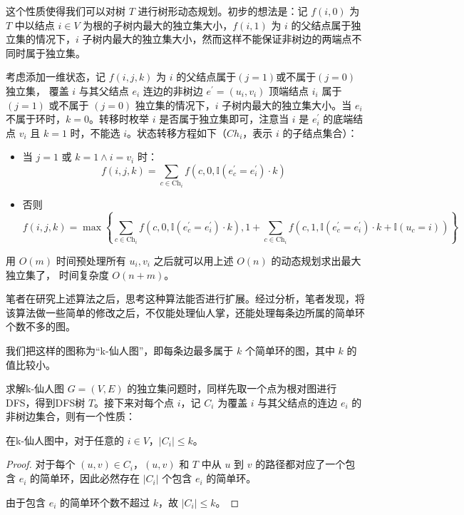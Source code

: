 \documentclass[lang=cn,11pt,a4paper]{elegantpaper}
\newcommand{\I}{\mathbb{I}}
\begin{document}
这个性质使得我们可以对树 $T$ 进行树形动态规划。初步的想法是：记 $f(i, 0)$ 为 $T$ 中以结点 $i \in V$ 为根的子树内最大的独立集大小，$f(i, 1)$ 为 $i$ 的父结点属于独立集的情况下，$i$ 子树内最大的独立集大小，然而这样不能保证非树边的两端点不同时属于独立集。

考虑添加一维状态，记 $f(i, j, k)$ 为 $i$ 的父结点属于$(j = 1)$或不属于$(j = 0)$独立集， 覆盖 $i$ 与其父结点 $e_i$ 连边的非树边 $e^{'} = (u_i, v_i)$ 顶端结点 $i_i$ 属于 $(j = 1)$ 或不属于 $(j = 0)$ 独立集的情况下，$i$ 子树内最大的独立集大小。当 $e_i$ 不属于环时，$k = 0$。转移时枚举 $i$ 是否属于独立集即可，注意当 $i$ 是 $e_i^{'}$ 的底端结点 $v_i$ 且 $k = 1$ 时，不能选 $i$。状态转移方程如下（$Ch_i$，表示 $i$ 的子结点集合）：

\begin{itemize}
    \item 当 $j = 1$ 或 $k = 1 \wedge i = v_i$ 时：
    \[f(i, j, k)=\sum_{c \in \mathrm{Ch}_{i}} f\left(c, 0,\I(e_{c}^{\prime}=e_{i}^{\prime}) \cdot k\right)\]
    \item 否则
    \[f(i, j, k)=\max \left\{\sum_{c \in \mathrm{Ch}_{i}} f\left(c, 0,\I\left(e_{c}^{\prime}=e_{i}^{\prime}\right) \cdot k\right), 1+\sum_{c \in \mathrm{Ch}_{i}} f\left(c, 1,\I(e_{c}^{\prime}=e_{i}^{\prime}) \cdot k+\I\left(u_{c}=i\right)\right)\right\}\]
\end{itemize}

用 $O(m)$ 时间预处理所有 $u_i, v_i$ 之后就可以用上述 $O(n)$ 的动态规划求出最大独立集了， 时间复杂度 $O(n + m)$。

笔者在研究上述算法之后，思考这种算法能否进行扩展。经过分析，笔者发现，将该算法做一些简单的修改之后，不仅能处理仙人掌，还能处理每条边所属的简单环个数不多的图。

我们把这样的图称为“k-仙人图”，即每条边最多属于 $k$ 个简单环的图，其中 $k$ 的值比较小。

求解k-仙人图 $G = (V, E)$ 的独立集问题时，同样先取一个点为根对图进行DFS，得到DFS树 $T$。接下来对每个点 $i$，记 $C_i$ 为覆盖 $i$ 与其父结点的连边 $e_i$ 的非树边集合，则有一个性质：

\begin{theorem}
    在k-仙人图中，对于任意的 $i \in V$，$|C_i| \le k$。
\end{theorem}
\begin{proof}
    对于每个 $(u, v) \in C_i$，$(u, v)$ 和 $T$ 中从 $u$ 到 $v$ 的路径都对应了一个包含 $e_i$ 的简单环，因此必然存在 $|C_i|$ 个包含 $e_i$ 的简单环。

    由于包含 $e_i$ 的简单环个数不超过 $k$，故 $|C_i| \le k$。
\end{proof}
\end{document}
